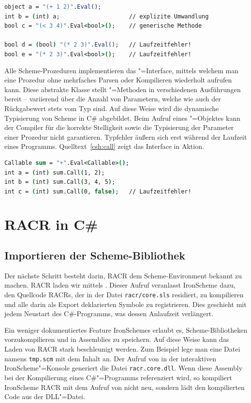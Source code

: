 \begin{lstlisting}[language=csh, caption={Auswerten von Scheme-Ausdrücken}, label=csh:eval]
object a = "(+ 1 2)".Eval();
int b = (int) a;					// explizite Umwandlung
bool c = "(< 3 4)".Eval<bool>();	// generische Methode

bool d = (bool) "(* 2 3)".Eval();	// Laufzeitfehler!
bool e = "(* 2 3)".Eval<bool>();	// Laufzeitfehler!
\end{lstlisting}

Alle Scheme-Prozeduren implementieren das "=Interface, mittels welchem man eine Prozedur ohne mehrfaches Parsen oder Kompilieren wiederholt aufrufen kann. Diese abstrakte Klasse stellt "=Methoden in verschiedenen Ausführungen bereit – variierend über die Anzahl von Parametern, welche wie auch der Rückgabewert stets vom Typ  sind. Auf diese Weise wird die dynamische Typisierung von Scheme in C\# abgebildet. Beim Aufruf eines "=Objektes kann der Compiler für die korrekte Stelligkeit sowie die Typisierung der Parameter einer Prozedur nicht garantieren. Typfehler äußern sich erst während der Laufzeit eines Programms. Quelltext~\ref{csh:call} zeigt das Interface in Aktion.

\begin{lstlisting}[language=csh, caption={Verwendung des \csh{Callable}"=Interfaces}, label=csh:call]
Callable sum = "+".Eval<Callable>();
int a = (int) sum.Call(1, 2);
int b = (int) sum.Call(3, 4, 5);
int c = (int) sum.Call(0, false);	// Laufzeitfehler!
\end{lstlisting}

\section{RACR in C\#}

\subsection{Importieren der Scheme-Bibliothek}

Der nächste Schritt besteht darin, RACR dem Scheme-Environment bekannt zu machen. RACR laden wir mittels . Dieser Aufruf veranlasst IronScheme dazu, den Quellcode RACRs, der in der Datei \verb|racr/core.sls| residiert, zu kompilieren und alle darin als Export deklarierten Symbole zu registrieren. Dies geschieht mit jedem Neustart des C\#-Programms, was dessen Anlaufzeit verlängert.

Ein weniger dokumentiertes Feature IronSchemes erlaubt es, Scheme-Bibliotheken vorzukompilieren und in Assemblies zu speichern. Auf diese Weise kann das Laden von RACR stark beschleunigt werden. Zum Beispiel lege man eine Datei namens \verb|tmp.scm| mit dem Inhalt  an. Der Aufruf von  in der interaktiven IronScheme"=Konsole generiert die Datei \verb|racr.core.dll|. Wenn diese Assembly bei der Kompilierung eines C\#"=Programms referenziert wird, so kompiliert IronScheme RACR mit dem Aufruf von  nicht neu, sondern lädt den kompilierten Code aus der DLL"=Datei.


